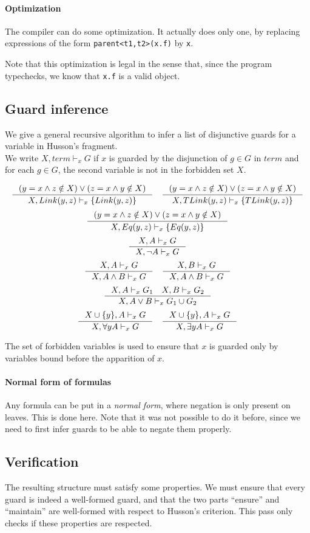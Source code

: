 \documentclass[10pt,a4paper]{article}
\newcommand{\ocaml}{\texttt}
\begin{document}
\paragraph{Optimization}
The compiler can do some optimization. It actually does only one, by replacing expressions of the form
\ocaml{parent<t1,t2>(x.f)} by \ocaml{x}.

Note that this optimization is legal in the sense that, since the program typechecks, we know that \ocaml{x.f} is a valid object.

\subsection{Guard inference}
\label{subsec:guardinfer}
We give a general recursive algorithm to infer a list of disjunctive guards for a variable in Husson's fragment.\\
We write $X,term \vdash_x G$ if $x$ is guarded by the disjunction of $g\in G$ in $term$ and for each $g\in G$, the second variable is not in the forbidden set $X$.

\[\inference{(y=x \land z \notin X) \lor (z=x \land y \notin X)}{X, Link(y,z) \vdash_x \{ Link(y,z) \}}  \quad \inference{(y=x \land z \notin X) \lor (z=x \land y \notin X)}{X, TLink(y,z) \vdash_x \{ TLink(y,z)\}}\]
\[\inference{(y=x \land z \notin X) \lor (z=x \land y \notin X)}{X, Eq(y,z) \vdash_x \{ Eq(y,z) \}}\]
\[\inference{X,A \vdash_x G }{X, \neg A \vdash_x G}\]
\[\inference{X,A \vdash_x G }{X, A\land B \vdash_x G} \quad \inference{X,B \vdash_x G }{X, A\land B \vdash_x G}\]
\[\inference{X,A \vdash_x G_1  \quad X,B \vdash_x G_2}
  {X, A\lor B \vdash_x G_1 \cup G_2}\]
\[\inference{X\cup \{y\},A \vdash_x G }{X, \forall y A \vdash_x G} \quad
\inference{X\cup \{y\},A \vdash_x G }{X, \exists y A \vdash_x G}\]

The set of forbidden variables is used to ensure that $x$ is guarded only by variables bound before the apparition of $x$.


\paragraph{Normal form of formulas}
Any formula can be put in a \emph{normal form}, where negation is only present on leaves. This is done here. Note that it was not possible to do it before, since we need to first infer guards to be able to negate them properly.

\subsection{Verification}
\label{subsec:verification}
The resulting structure must satisfy some properties. We must ensure that every guard is indeed a well-formed guard, and that the two parts ``ensure'' and ``maintain'' are well-formed with respect to Husson's criterion. This pass only checks if these properties are respected.
\end{document}
